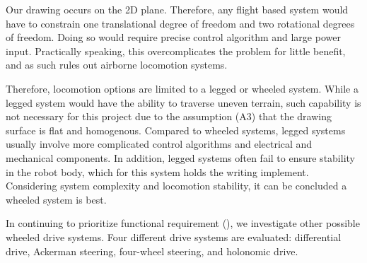 Our drawing occurs on the 2D plane. Therefore, any flight based system would have to constrain one translational degree of freedom and two rotational degrees of freedom. Doing so would require precise control algorithm and large power input. Practically speaking, this overcomplicates the problem for little benefit, and as such rules out airborne locomotion systems.

Therefore, locomotion options are limited to a legged or wheeled system. While a legged system would have the ability to traverse uneven terrain, such capability is not necessary for this project due to the assumption (A3) that the drawing surface is flat and homogenous. Compared to wheeled systems, legged systems usually involve more complicated control algorithms and electrical and mechanical components. In addition, legged systems often fail to ensure stability in the robot body, which for this system holds the writing implement. Considering system complexity and locomotion stability, it can be concluded a wheeled system is best.

In continuing to prioritize functional requirement (), we investigate other possible wheeled drive systems. Four different drive systems are evaluated: differential drive, Ackerman steering, four-wheel steering, and holonomic drive. 



